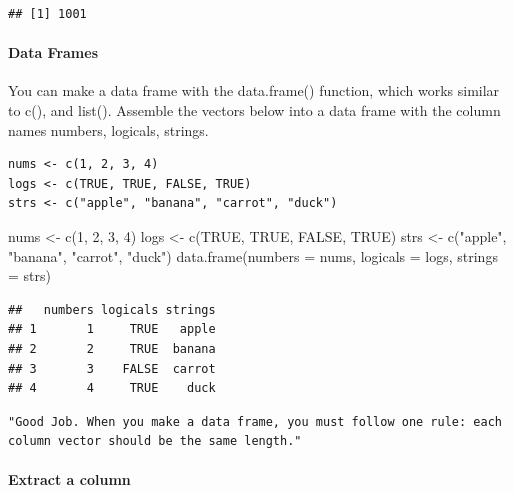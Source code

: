 \documentclass[
]{article}
\newenvironment{Shaded}{\begin{snugshade}}{\end{snugshade}}
\newcommand{\AttributeTok}[1]{\textcolor[rgb]{0.77,0.63,0.00}{#1}}
\newcommand{\ConstantTok}[1]{\textcolor[rgb]{0.00,0.00,0.00}{#1}}
\newcommand{\DecValTok}[1]{\textcolor[rgb]{0.00,0.00,0.81}{#1}}
\newcommand{\FunctionTok}[1]{\textcolor[rgb]{0.00,0.00,0.00}{#1}}
\newcommand{\NormalTok}[1]{#1}
\newcommand{\OtherTok}[1]{\textcolor[rgb]{0.56,0.35,0.01}{#1}}
\newcommand{\StringTok}[1]{\textcolor[rgb]{0.31,0.60,0.02}{#1}}
\begin{document}
\begin{verbatim}
## [1] 1001
\end{verbatim}

\hypertarget{data-frames}{%
\paragraph{Data Frames}\label{data-frames}}

You can make a data frame with the data.frame() function, which works
similar to c(), and list(). Assemble the vectors below into a data frame
with the column names numbers, logicals, strings.

\begin{verbatim}
nums <- c(1, 2, 3, 4)
logs <- c(TRUE, TRUE, FALSE, TRUE)
strs <- c("apple", "banana", "carrot", "duck")
\end{verbatim}

\begin{Shaded}
\begin{Highlighting}[]
\NormalTok{nums }\OtherTok{\textless{}{-}} \FunctionTok{c}\NormalTok{(}\DecValTok{1}\NormalTok{, }\DecValTok{2}\NormalTok{, }\DecValTok{3}\NormalTok{, }\DecValTok{4}\NormalTok{)}
\NormalTok{logs }\OtherTok{\textless{}{-}} \FunctionTok{c}\NormalTok{(}\ConstantTok{TRUE}\NormalTok{, }\ConstantTok{TRUE}\NormalTok{, }\ConstantTok{FALSE}\NormalTok{, }\ConstantTok{TRUE}\NormalTok{)}
\NormalTok{strs }\OtherTok{\textless{}{-}} \FunctionTok{c}\NormalTok{(}\StringTok{"apple"}\NormalTok{, }\StringTok{"banana"}\NormalTok{, }\StringTok{"carrot"}\NormalTok{, }\StringTok{"duck"}\NormalTok{)}
\FunctionTok{data.frame}\NormalTok{(}\AttributeTok{numbers =}\NormalTok{ nums, }\AttributeTok{logicals =}\NormalTok{ logs, }\AttributeTok{strings =}\NormalTok{ strs)}
\end{Highlighting}
\end{Shaded}

\begin{verbatim}
##   numbers logicals strings
## 1       1     TRUE   apple
## 2       2     TRUE  banana
## 3       3    FALSE  carrot
## 4       4     TRUE    duck
\end{verbatim}

\begin{verbatim}
"Good Job. When you make a data frame, you must follow one rule: each column vector should be the same length."
\end{verbatim}

\hypertarget{extract-a-column}{%
\paragraph{Extract a column}\label{extract-a-column}}
\end{document}
